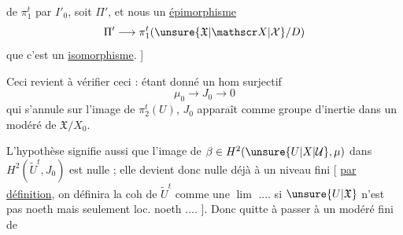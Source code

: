 
de $\pi_1^t$ par $I'_0$, soit  $\Pi'$, et nous   un \uline{épimorphisme}
\[
 \Pi'\longrightarrow\pi_1^t(\unsure{\mathfrak X|\mathscr X|\mathcal X}/D)
\]
 que c'est un \uline{isomorphisme}. ]

Ceci revient à vérifier ceci : étant donné un hom surjectif
\[
 \mu_0\longrightarrow J_0\longrightarrow0
\]
qui s'annule sur l'image de $\pi_2^t(U)$,  $J_0$ apparaît comme groupe d'inertie dans un   modéré de $\mathfrak X/X_0$.

L'hypothèse signifie aussi que l'image de $\beta\in H^2(\unsure{U|X|\mathcal U},\mu)$ dans $H^2(\widetilde U^t,J_0)$ est nulle ; elle devient donc nulle déjà  à un niveau fini [ \uline{par définition}, on définira la coh de $\widetilde U^t$ comme une \uline{$\lim$} .... si $\unsure{U|\mathfrak X}$ n'est pas noeth  mais seulement loc. noeth .... ]. Donc quitte à passer à un  modéré fini de    
